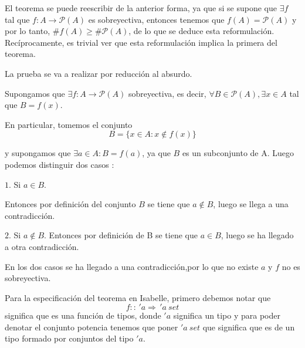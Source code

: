 \begin{isabellebody}
\begin{isamarkuptext}
\begin{teorema}
\end{teorema}

El teorema se puede reescribir de la anterior forma, ya que si
 se supone que $\exists f$ tal que $f: A \longrightarrow \mathcal{P}(A)$
es sobreyectiva, entonces tenemos que $f(A) = \mathcal{P}(A)$ y por lo
 tanto, $\# f(A) \geq \# \mathcal{P}(A)$, de lo que se deduce esta
 reformulación. Recíprocamente, es trivial ver que esta reformulación
 implica la primera del teorema. 


\begin{demostracion}

La prueba se va a realizar por reducción al absurdo.

Supongamos que $\exists f : A \longrightarrow \mathcal{P}(A)$
 sobreyectiva, es decir, $\forall B \in \mathcal{P}(A) ,  \exists x \in
 A$ tal que $B = f(x)$.

En particular, tomemos el conjunto
 $$B = \{ x \in A : x \notin f(x) \}$$

 y  supongamos que $\exists a \in A : B = f(a)$, ya que $B$ es un
 subconjunto de A. Luego podemos distinguir dos casos :

$1.$ Si $a \in B.$

 Entonces por definición del conjunto $B$ se tiene que
$a \notin B$, luego se llega a una contradicción. 

$2.$ Si $a \notin B.$
 Entonces por definición de B se tiene que $a \in 
B$, luego se ha llegado a otra contradicción. 

En los dos casos se ha llegado a una contradicción,por lo que no existe
 $a$ y $f$ no es sobreyectiva.
\end{demostracion}%
\end{isamarkuptext}\isamarkuptrue%
%
\isadelimdocument
%
\endisadelimdocument
%
\isatagdocument
%
\isamarkuptrue%
%
\endisatagdocument
{\isafolddocument}%
%
\isadelimdocument
%
\endisadelimdocument
%
\begin{isamarkuptext}%
Para la especificación del teorema en Isabelle, primero debemos notar
 que $$f :: \, 'a \Rightarrow \,'a \: set$$ significa que es una función 
de tipos, donde $'a$ significa un tipo y para poder denotar
el conjunto potencia tenemos que poner $'a \ set$ que significa que es
 de un tipo formado por conjuntos del tipo $'a$.



\end{isamarkuptext}
\end{isabellebody}
